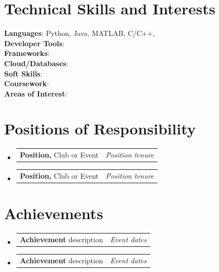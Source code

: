\documentclass[a4paper,11pt]{article}
\makeatletter
\newcommand{\resumePOR}[3]{
\vspace{0.5mm}\item
    \begin{tabular*}{0.97\textwidth}[t]{l@{\extracolsep{\fill}}r}
        \textbf{#1}\hspace{0.3mm}#2 & \textit{\small{#3}} 
    \end{tabular*}
    \vspace{-2mm}
}
\newcommand{\resumeSubHeadingListStart}{\begin{itemize}[leftmargin=*,labelsep=0mm]}
\newcommand{\resumeSubHeadingListEnd}{\end{itemize}\vspace{2mm}}
\makeatother
\begin{document}
\section{\textbf{Technical Skills and Interests}}
 \begin{itemize}[leftmargin=0.05in, label={}]
    \small{\item{
     \textbf{Languages}{: Python, Java, MATLAB, C/C++, } \\
     \textbf{Developer Tools}{: } \\
     \textbf{Frameworks}{: } \\
     \textbf{Cloud/Databases}{: } \\
     \textbf{Soft Skills}{: } \\
     \textbf{Coursework}{: } \\
     \textbf{Areas of Interest}{: } \\
    }}
 \end{itemize}
 \vspace{-16pt}



\section{\textbf{Positions of Responsibility}}
\vspace{-0.4mm}
\resumeSubHeadingListStart
\resumePOR{Position, } %
    {Club or Event} %
    {Position tenure} %
\resumePOR{Position, } %
    {Club or Event} %
    {Position tenure} %
\resumeSubHeadingListEnd
\vspace{-5mm}




\section{\textbf{Achievements}}
\vspace{-0.4mm}
\resumeSubHeadingListStart
\resumePOR{Achievement } %
    {description} %
    {Event dates} %
    
\resumePOR{Achievement } %
    {description} %
    {Event dates} %
\resumeSubHeadingListEnd
\vspace{-5mm}



\end{document}
